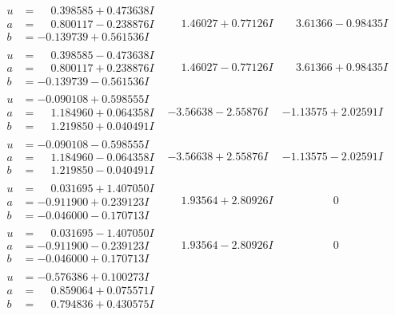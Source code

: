 \documentclass[1p]{elsarticle_modified}
\theoremstyle{definition}
\begin{document}
$$\begin{array}{c|c|c}
\begin{aligned}
u &= \phantom{-}0.398585 + 0.473638 I \\
a &= \phantom{-}0.800117 - 0.238876 I \\
b &= -0.139739 + 0.561536 I\end{aligned}
 & \phantom{-}1.46027 + 0.77126 I & \phantom{-}3.61366 - 0.98435 I \\ \hline\begin{aligned}
u &= \phantom{-}0.398585 - 0.473638 I \\
a &= \phantom{-}0.800117 + 0.238876 I \\
b &= -0.139739 - 0.561536 I\end{aligned}
 & \phantom{-}1.46027 - 0.77126 I & \phantom{-}3.61366 + 0.98435 I \\ \hline\begin{aligned}
u &= -0.090108 + 0.598555 I \\
a &= \phantom{-}1.184960 + 0.064358 I \\
b &= \phantom{-}1.219850 + 0.040491 I\end{aligned}
 & -3.56638 - 2.55876 I & -1.13575 + 2.02591 I \\ \hline\begin{aligned}
u &= -0.090108 - 0.598555 I \\
a &= \phantom{-}1.184960 - 0.064358 I \\
b &= \phantom{-}1.219850 - 0.040491 I\end{aligned}
 & -3.56638 + 2.55876 I & -1.13575 - 2.02591 I \\ \hline\begin{aligned}
u &= \phantom{-}0.031695 + 1.407050 I \\
a &= -0.911900 + 0.239123 I \\
b &= -0.046000 - 0.170713 I\end{aligned}
 & \phantom{-}1.93564 + 2.80926 I & \phantom{-0.000000 } 0 \\ \hline\begin{aligned}
u &= \phantom{-}0.031695 - 1.407050 I \\
a &= -0.911900 - 0.239123 I \\
b &= -0.046000 + 0.170713 I\end{aligned}
 & \phantom{-}1.93564 - 2.80926 I & \phantom{-0.000000 } 0 \\ \hline\begin{aligned}
u &= -0.576386 + 0.100273 I \\
a &= \phantom{-}0.859064 + 0.075571 I \\
b &= \phantom{-}0.794836 + 0.430575 I\end{aligned}

\end{array}$$
\end{document}
